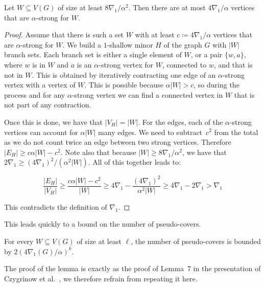 \begin{lemma}\label{lem:num-high-degree}
Let $W\subseteq V(G)$ of size at least $8\nabla_1 / \alpha^2$.
Then there are at most $4\nabla_1/\alpha$ vertices that are
$\alpha$-strong for $W$.
\end{lemma}
\begin{proof}
  Assume that there is such a set $W$ with at least $c\coloneq 4\nabla_1 /\alpha$ vertices that are $\alpha$-strong for $W$.
  We build a $1$-shallow minor $H$ of the graph $G$ with $|W|$ branch sets.
  Each branch set is either a single element of $W$, or a pair $\{w,a\}$, where $w$ is in $W$ and $a$ is an $\alpha$-strong vertex for $W$, connected to $w$, and that is not in $W$. This is obtained by iteratively contracting one edge of an $\alpha$-strong vertex with a vertex of $W$. This is possible because $\alpha |W|>c$, so during the process and for any \mbox{$\alpha$-strong} vertex we can find a connected vertex in $W$ that is not part of any contraction.

  Once this is done, we have that $|V_H|=|W|$. For the edges, each of the \mbox{$\alpha$}-strong vertices can account for $\alpha |W|$ many edges. We need to subtract~$c^2$ from the total as we do not count twice an edge between two strong vertices. Therefore $|E_H| \ge c\alpha |W| - c^2$. Note also that because $|W| \ge 8\nabla_1 / \alpha^2$, we have that $ 2\nabla_1\ge (4\nabla_1)^2 / (\alpha^2|W|)$. All of this together leads to:

  $$\frac{|E_H|}{|V_H|} \ge \frac{c\alpha |W| - c^2}{|W|} \ge 4 \nabla_1 - \frac{(4\nabla_1)^2}{\alpha^2|W|} \ge 4\nabla_1 - 2\nabla_1 > \nabla_1 $$

  This contradicts the definition of $\nabla_1$.
\end{proof}

This leads quickly to a bound on the number of pseudo-covers.

\begin{lemma}\label{lem:num-pseudo-covers}
For every $W\subseteq V(G)$ of size at least $\ell$, the number of pseudo-covers is bounded by $2(4\nabla_1(G)/\alpha)^k$.
\end{lemma}

The proof of the lemma is exactly as the proof of Lemma~7 in the
presentation of Czygrinow et al.~\cite{czygrinow2018distributed},
we therefore refrain from repeating it here.

%

